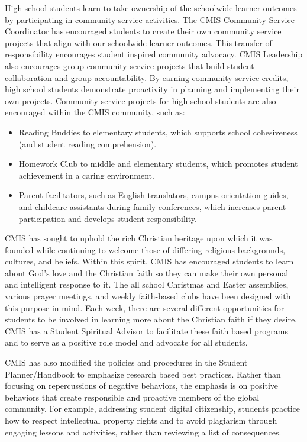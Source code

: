 High school students learn to take ownership of the schoolwide learner outcomes by participating in community service activities. The CMIS Community Service Coordinator has encouraged students to create their own community service projects that align with our schoolwide learner outcomes. This transfer of responsibility encourages student inspired community advocacy.  CMIS Leadership also encourages group community service projects that build student collaboration and group accountability. By earning community service credits, high school students demonstrate proactivity in planning and implementing their own projects.  Community service projects for high school students are also encouraged within the CMIS community, such as: 
\begin{itemize}
\item Reading Buddies to elementary students, which supports school cohesiveness (and student reading comprehension). 
\item Homework Club to middle and elementary students, which promotes student achievement in a caring environment. 
\item Parent facilitators, such as English translators, campus orientation guides, and childcare assistants during family conferences, which increases parent participation and develops student responsibility.
\end{itemize}

CMIS has sought to uphold the rich Christian heritage upon which it was founded while continuing to welcome those of differing religious backgrounds, cultures, and beliefs. Within this spirit, CMIS has encouraged students to learn about God’s love and the Christian faith so they can make their own personal and intelligent response to it. The all school Christmas and Easter assemblies, various prayer meetings, and weekly faith-based clubs have been designed with this purpose in mind. Each week, there are several different opportunities for students to be involved in learning more about the Christian faith if they desire. CMIS has a Student Spiritual Advisor to facilitate these faith based programs and to serve as a positive role model and advocate for all students.

CMIS has also modified the policies and procedures in the Student Planner/Handbook to emphasize research based best practices. Rather than focusing on repercussions of negative behaviors, the emphasis is on positive behaviors that create responsible and proactive members of the global community.  For example, addressing student digital citizenship, students practice how to respect intellectual property rights and to avoid plagiarism through engaging lessons and activities, rather than reviewing a list of consequences. 

